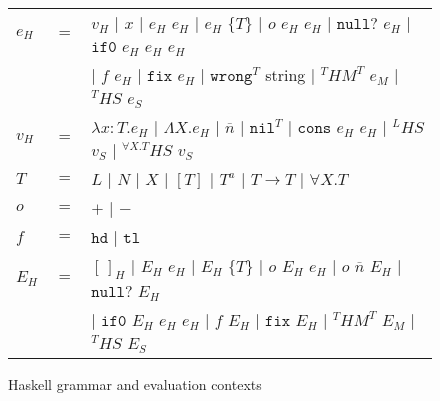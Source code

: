 \begin{figure}[p]
\centering
\begin{tabular}{lcl}
\vspace{5pt}

$e_{H}$ & $=$ & $v_{H}$ $\vert$ $x$ $\vert$ $e_{H}$ $e_{H}$ $\vert$ $e_{H}$ $\lbrace T\rbrace$ $\vert$ $o$ $e_{H}$ $e_{H}$ $\vert$ $\mathtt{null?}$ $e_{H}$ $\vert$ $\mathtt{if0}$ $e_{H}$ $e_{H}$ $e_{H}$ \\

\vspace{5pt}

&& $\vert$ $f$ $e_{H}$ $\vert$ $\mathtt{fix}$ $e_{H}$ $\vert$ $\mathtt{wrong}^{T}$ string $\vert$ $^{T}HM^{T}$ $e_{M}$ $\vert$ $^{T}HS$ $e_{S}$ \\

\vspace{5pt}

$v_{H}$ & $=$ & $\lambda x:T.e_{H}$ $\vert$ $\Lambda X.e_{H}$ $\vert$ $\overline{n}$ $\vert$ $\mathtt{nil}^{T}$ $\vert$ $\mathtt{cons}$ $e_{H}$ $e_{H}$ $\vert$ $^{L}HS$ $v_{S}$ $\vert$ $^{\forall X.T}HS$ $v_{S}$ \\

\vspace{5pt}

$T$ & $=$ & $L$ $\vert$ $N$ $\vert$ $X$ $\vert$ $[T]$ $\vert$ $T^{a}$ $\vert$ $T\rightarrow T$ $\vert$ $\forall X.T$ \\

\vspace{5pt}

$o$ & $=$ & $+$ $\vert$ $-$ \\

\vspace{5pt}

$f$ & $=$ & $\mathtt{hd}$ $\vert$ $\mathtt{tl}$ \\

\vspace{5pt}

$E_{H}$ & $=$ & $[\,]_{H}$ $\vert$ $E_{H}$ $e_{H}$ $\vert$ $E_{H}$ $\lbrace T\rbrace$ $\vert$ $o$ $E_{H}$ $e_{H}$ $\vert$ $o$ $\overline{n}$ $E_{H}$ $\vert$ $\mathtt{null?}$ $E_{H}$ \\

\vspace{5pt}

&& $\vert$ $\mathtt{if0}$ $E_{H}$ $e_{H}$ $e_{H}$ $\vert$ $f$ $E_{H}$ $\vert$ $\mathtt{fix}$ $E_{H}$ $\vert$ $^{T}HM^{T}$ $E_{M}$ $\vert$ $^{T}HS$ $E_{S}$
\end{tabular}
\caption{Haskell grammar and evaluation contexts}
\label{hg}
\end{figure}